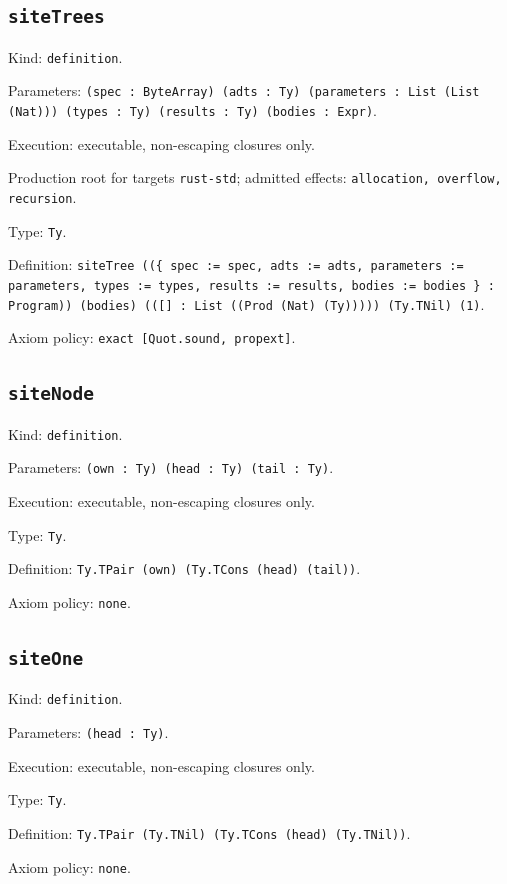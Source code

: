 \documentclass[11pt]{article}
\begin{document}
\subsection*{\texttt{siteTrees}}
\noindent Kind: \texttt{definition}.\par
\noindent Parameters: \texttt{(spec : ByteArray) (adts : Ty) (parameters : List (List (Nat))) (types : Ty) (results : Ty) (bodies : Expr)}.\par
\noindent Execution: executable, non-escaping closures only.\par
\noindent Production root for targets \texttt{rust-std}; admitted effects: \texttt{allocation, overflow, recursion}.\par
\noindent Type: \texttt{Ty}.\par
\noindent Definition: \texttt{siteTree ((\{ spec := spec, adts := adts, parameters := parameters, types := types, results := results, bodies := bodies \} : Program)) (bodies) (([] : List ((Prod (Nat) (Ty))))) (Ty.TNil) (1)}.\par
\noindent Axiom policy: \texttt{exact [Quot.sound, propext]}.\par
\subsection*{\texttt{siteNode}}
\noindent Kind: \texttt{definition}.\par
\noindent Parameters: \texttt{(own : Ty) (head : Ty) (tail : Ty)}.\par
\noindent Execution: executable, non-escaping closures only.\par
\noindent Type: \texttt{Ty}.\par
\noindent Definition: \texttt{Ty.TPair (own) (Ty.TCons (head) (tail))}.\par
\noindent Axiom policy: \texttt{none}.\par
\subsection*{\texttt{siteOne}}
\noindent Kind: \texttt{definition}.\par
\noindent Parameters: \texttt{(head : Ty)}.\par
\noindent Execution: executable, non-escaping closures only.\par
\noindent Type: \texttt{Ty}.\par
\noindent Definition: \texttt{Ty.TPair (Ty.TNil) (Ty.TCons (head) (Ty.TNil))}.\par
\noindent Axiom policy: \texttt{none}.\par
\end{document}
